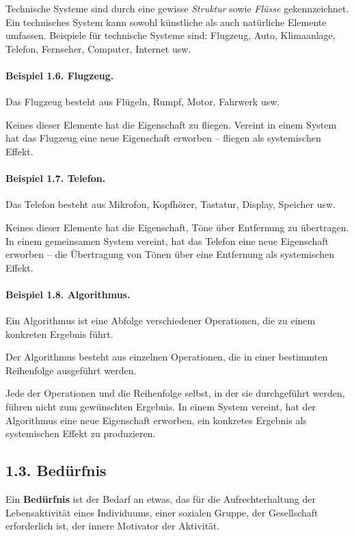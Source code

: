 \documentclass[11pt,a4paper]{article}
\begin{document}
Technische Systeme sind durch eine gewisse \emph{Struktur} sowie \emph{Flüsse}
gekennzeichnet.  Ein technisches System kann sowohl künstliche als auch
natürliche Elemente umfassen.  Beispiele für technische Systeme sind:
Flugzeug, Auto, Klimaanlage, Telefon, Fernseher, Computer, Internet usw.

\paragraph{Beispiel 1.6. Flugzeug.}
Das Flugzeug besteht aus Flügeln, Rumpf, Motor, Fahrwerk usw.

Keines dieser Elemente hat die Eigenschaft zu fliegen. Vereint in einem System
hat das Flugzeug eine neue Eigenschaft erworben -- fliegen als systemischen
Effekt.

\paragraph{Beispiel 1.7. Telefon.}
Das Telefon besteht aus Mikrofon, Kopfhörer, Tastatur, Display, Speicher usw.

Keines dieser Elemente hat die Eigenschaft, Töne über Entfernung zu
übertragen. In einem gemeinsamen System vereint, hat das Telefon eine neue
Eigenschaft erworben -- die Übertragung von Tönen über eine Entfernung als
systemischen Effekt.

\paragraph{Beispiel 1.8. Algorithmus.}
Ein Algorithmus ist eine Abfolge verschiedener Operationen, die zu einem
konkreten Ergebnis führt.

Der Algorithmus besteht aus einzelnen Operationen, die in einer bestimmten
Reihenfolge ausgeführt werden.

Jede der Operationen und die Reihenfolge selbst, in der sie durchgeführt
werden, führen nicht zum gewünschten Ergebnis. In einem System vereint, hat
der Algorithmus eine neue Eigenschaft erworben, ein konkretes Ergebnis als
systemischen Effekt zu produzieren.

\subsection*{1.3. Bedürfnis}

Ein \textbf{Bedürfnis} ist der Bedarf an etwas, das für die Aufrechterhaltung
der Lebensaktivität eines Individuums, einer sozialen Gruppe, der Gesellschaft
erforderlich ist, der innere Motivator der Aktivität.
\end{document}

